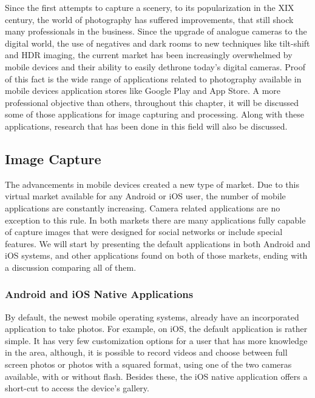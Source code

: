 Since the first attempts to capture a scenery, to its popularization in the XIX century, the world of photography has suffered improvements, that still shock many professionals in the business. Since the upgrade of analogue cameras to the digital world, the use of negatives and dark rooms to new techniques like tilt-shift and HDR imaging, the current market has been increasingly overwhelmed by mobile devices and their ability to easily dethrone today's digital cameras. Proof of this fact is the wide range of applications related to photography available in mobile devices application stores like Google Play and App Store. A more professional objective than others, throughout this chapter, it will be discussed some of those applications for image capturing and processing. Along with these applications, research that has been done in this field will also be discussed.

\subsection{Image Capture}

The advancements in mobile devices created a new type of market. Due to this virtual market available for any Android or iOS user, the number of mobile applications are constantly increasing. Camera related applications are no exception to this rule. In both markets there are many applications fully capable of capture images that were designed for social networks or include special features. We will start by presenting the default applications in both Android and iOS systems, and other applications found on both of those markets, ending with a discussion comparing all of them.

\subsubsection{Android and iOS Native Applications}

By default, the newest mobile operating systems, already have an incorporated application to take photos. For example, on iOS, the default application is rather simple. It has very few customization options for a user that has more knowledge in the area, although, it is possible to record videos and choose between full screen photos or photos with a squared format, using one of the two cameras available, with or without flash. Besides these, the iOS native application offers a short-cut to access the device's gallery.

